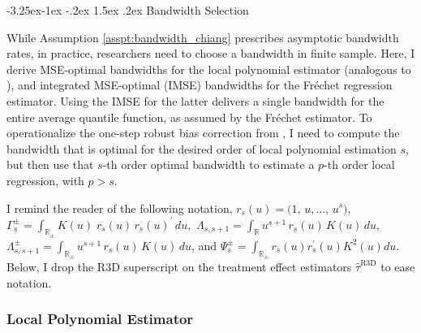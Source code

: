 \documentclass[12pt]{article}
\makeatletter
\renewcommand\subsection{\@startsection{subsection}{2}{\z@}%
  {-3.25ex\@plus -1ex \@minus -.2ex}%
  {1.5ex \@plus .2ex}%
  {\itshape\large\center}} %
\makeatother
\begin{document}
\subsection{Bandwidth Selection} \label{sec_app:bandwidth}

While Assumption \ref{asspt:bandwidth_chiang} prescribes asymptotic bandwidth rates, in practice, researchers need to choose a bandwidth in finite sample. Here, I derive MSE-optimal bandwidths for the local polynomial estimator (analogous to \citet[Supplement F]{chiang2019robust}), and integrated MSE-optimal (IMSE) bandwidths for the Fr\'echet regression estimator. Using the IMSE for the latter delivers a single bandwidth for the entire average quantile function, as assumed by the Fr\'echet estimator. To operationalize the one-step robust bias correction from \citet{calonico2014robust}, I need to compute the bandwidth that is optimal for the desired order of local polynomial estimation $s$, but then use that $s$-th order optimal bandwidth to estimate a $p$-th order local regression, with $p>s$. 

I remind the reader of the following notation,
$
  r_{s}(u) 
  = \bigl(1,\,u,\dots,\,u^{s}\bigr)
$, $\Gamma_{s}^{\pm} 
  =
  \int_{\mathbb{R}_{\pm}}
    K(u)\;r_{s}(u)\,r_{s}(u)^\prime
  \,du,$   $
  \Lambda_{s,s+1}
  =
  \int_{\mathbb{R}}
     u^{s+1}\,r_{s}(u)\,K(u)
  \,du $, 
  $
  \Lambda_{s,s+1}^{\pm}
  =
  \int_{\mathbb{R}_{\pm}}
     u^{s+1}\,r_{s}(u)\,K(u)
  \,du $, and 
$
\Psi_s^{ \pm}=\int_{\mathbb{R}_{ \pm}} r_s(u) r_s^{\prime}(u) K^2(u) d u
$.  Below, I drop the $\mathrm{R3D}$ superscript on the treatment effect estimators $\hat{\tau}^{\mathrm{R3D}}$ to ease notation. 

\subsubsection{Local Polynomial Estimator} \label{sec_app:locpol}
\end{document}
